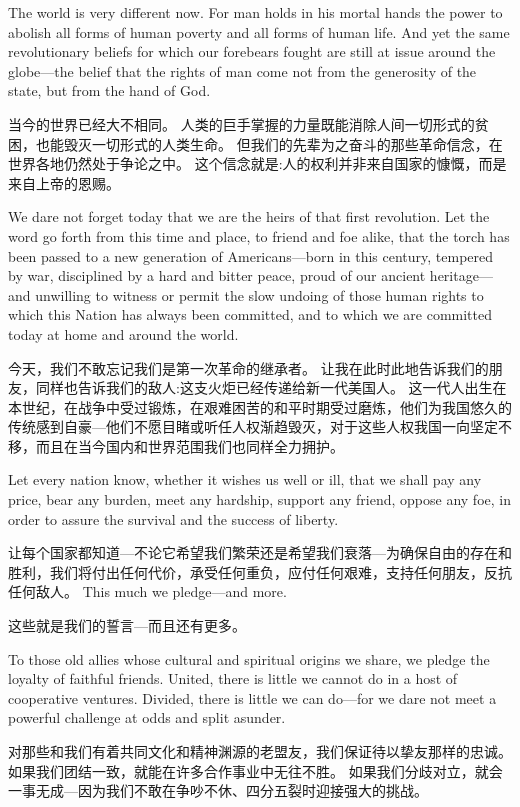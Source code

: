 \documentclass[cs4size, a4paper, 12pt]{article}
\newcounter{numpar}
\newcommand*{\newpar}{\numpar{}}
\begin{document}
	\newpar The world is very different now. For man holds in his mortal hands the power to abolish all forms of human poverty and all forms of human life. And yet the same revolutionary beliefs for which our forebears fought are still at issue around the globe—the belief that the rights of man come not from the generosity of the state, but from the hand of God.
	
	当今的世界已经大不相同。 人类的巨手掌握的力量既能消除人间一切形式的贫困，也能毁灭一切形式的人类生命。 但我们的先辈为之奋斗的那些革命信念，在世界各地仍然处于争论之中。 这个信念就是:人的权利并非来自国家的慷慨，而是来自上帝的恩赐。 
	
	\newpar We dare not forget today that we are the heirs of that first revolution. Let the word go forth from this time and place, to friend and foe alike, that the torch has been passed to a new generation of Americans—born in this century, tempered by war, disciplined by a hard and bitter peace, proud of our ancient heritage—and unwilling to witness or permit the slow undoing of those human rights to which this Nation has always been committed, and to which we are committed today at home and around the world.
	
	今天，我们不敢忘记我们是第一次革命的继承者。 让我在此时此地告诉我们的朋友，同样也告诉我们的敌人:这支火炬已经传递给新一代美国人。 这一代人出生在本世纪，在战争中受过锻炼，在艰难困苦的和平时期受过磨炼，他们为我国悠久的传统感到自豪—他们不愿目睹或听任人权渐趋毁灭，对于这些人权我国一向坚定不移，而且在当今国内和世界范围我们也同样全力拥护。 
	
	\newpar Let every nation know, whether it wishes us well or ill, that we shall pay any price, bear any burden, meet any hardship, support any friend, oppose any foe, in order to assure the survival and the success of liberty.
	
	让每个国家都知道—不论它希望我们繁荣还是希望我们衰落—为确保自由的存在和胜利，我们将付出任何代价，承受任何重负，应付任何艰难，支持任何朋友，反抗任何敌人。  This much we pledge—and more.
	
	这些就是我们的誓言—而且还有更多。 
	
	\newpar To those old allies whose cultural and spiritual origins we share, we pledge the loyalty of faithful friends. United, there is little we cannot do in a host of cooperative ventures. Divided, there is little we can do—for we dare not meet a powerful challenge at odds and split asunder.
	
	对那些和我们有着共同文化和精神渊源的老盟友，我们保证待以挚友那样的忠诚。 如果我们团结一致，就能在许多合作事业中无往不胜。 如果我们分歧对立，就会一事无成—因为我们不敢在争吵不休、四分五裂时迎接强大的挑战。 
	
\end{document}
